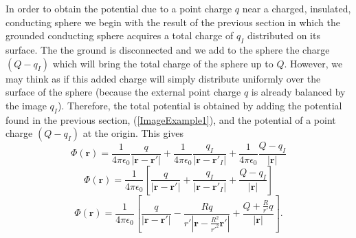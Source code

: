 In order to obtain the potential due to a point charge $q$ near a charged, insulated, conducting sphere we begin with the result of the previous section in which the grounded conducting sphere acquires a total charge of $q_I$ distributed on its surface. The the ground is disconnected and we add to the sphere the charge $(Q-q_I)$ which will bring the total charge of the sphere up to $Q$. However, we may think as if this added charge will simply distribute uniformly over the surface of the sphere (because the external point charge $q$ is already balanced by the image $q_I$). Therefore,  the total potential is obtained by adding the potential found in the previous section, (\ref{ImageExample1}), and the potential of a point charge $(Q-q_I)$ at the origin. This gives
\begin{equation}
\Phi (\textbf{r}) = \frac{1}{4\pi \epsilon_0} \frac{q}{\left| \textbf{r} - \textbf{r}' \right|} + \frac{1}{4\pi \epsilon_0} \frac{q_I}{\left| \textbf{r} - \textbf{r}'_I \right|} +  \frac{1}{4\pi \epsilon_0} \frac{Q-q_I}{\left| \textbf{r} \right|} \label{ChargedSpherePotential}
\end{equation}
\begin{equation}
\Phi (\textbf{r}) = \frac{1}{4\pi \epsilon_0} \left[ \frac{q}{\left| \textbf{r} - \textbf{r}' \right|} +  \frac{q_I}{\left| \textbf{r} - \textbf{r}'_I \right|} +   \frac{Q-q_I}{\left| \textbf{r} \right|} \right]
\end{equation}
\begin{equation}
\Phi (\textbf{r}) = \frac{1}{4\pi \epsilon_0} \left[ \frac{q}{\left| \textbf{r} - \textbf{r}' \right|} -  \frac{R q}{r' \left| \textbf{r} - \frac{R^2}{r'^2}\textbf{r}' \right|} +   \frac{Q+\frac{R}{r'}q}{\left| \textbf{r} \right|} \right].
\end{equation}

